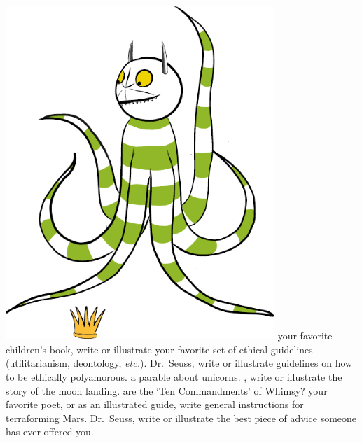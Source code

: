 \hfill\includegraphics[width=4in]{images/wild_things.pdf}
\newpage
\bversenonum {} your favorite children's book, write or illustrate your favorite set of ethical guidelines (utilitarianism, deontology, \textit{etc.}).
\bversenonum {} Dr.~Seuss, write or illustrate guidelines on how to be ethically polyamorous.
\bversenonum {} a parable about unicorns.
\bversenonum {}, write or illustrate the story of the moon landing.
\bversenonum {} are the `Ten Commandments' of Whimsy?
\bversenonum {} your favorite poet, or as an illustrated guide, write general instructions for terraforming Mars.
\bversenonum {} Dr.~Seuss, write or illustrate the best piece of advice someone has ever offered you.


